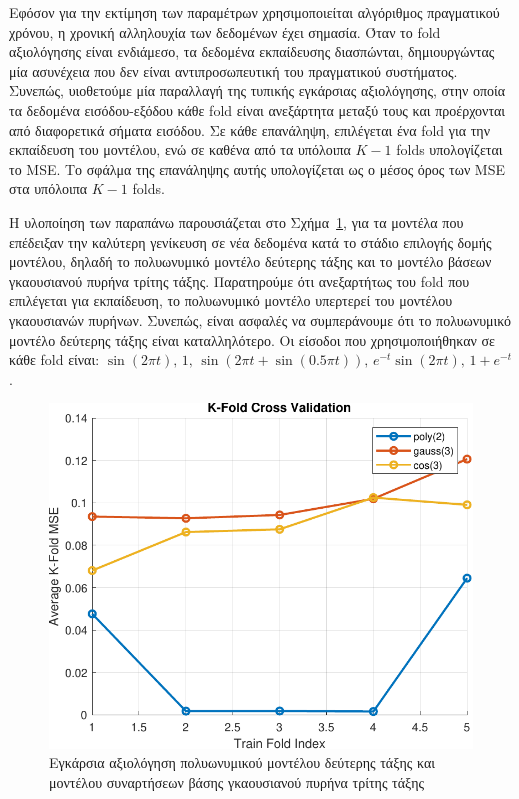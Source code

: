 \documentclass[a4paper,12pt]{article}
\begin{document}
Εφόσον για την εκτίμηση των παραμέτρων χρησιμοποιείται αλγόριθμος πραγματικού χρόνου, η χρονική αλληλουχία
των δεδομένων έχει σημασία. Όταν το fold αξιολόγησης είναι
ενδιάμεσο, τα δεδομένα εκπαίδευσης διασπώνται, δημιουργώντας μία ασυνέχεια που δεν είναι αντιπροσωπευτική
του πραγματικού συστήματος. Συνεπώς, υιοθετούμε μία παραλλαγή της τυπικής εγκάρσιας αξιολόγησης, στην οποία 
τα δεδομένα εισόδου-εξόδου κάθε fold είναι ανεξάρτητα μεταξύ τους 
και προέρχονται από διαφορετικά σήματα εισόδου. Σε κάθε επανάληψη, επιλέγεται ένα 
fold για την εκπαίδευση του μοντέλου, ενώ σε καθένα από τα 
υπόλοιπα $K-1$ folds υπολογίζεται το 
MSE. Το σφάλμα της επανάληψης αυτής υπολογίζεται ως ο μέσος όρος
των MSE στα υπόλοιπα $K-1$ 
folds. 

Η υλοποίηση των παραπάνω παρουσιάζεται στο Σχήμα~\ref{fig:task2_cross_validation}, για τα μοντέλα που 
επέδειξαν την καλύτερη γενίκευση σε νέα δεδομένα κατά το στάδιο επιλογής δομής μοντέλου, δηλαδή το 
πολυωνυμικό μοντέλο δεύτερης τάξης και το μοντέλο βάσεων γκαουσιανού πυρήνα τρίτης τάξης. 
Παρατηρούμε ότι ανεξαρτήτως του fold που επιλέγεται για εκπαίδευση,
το πολυωνυμικό μοντέλο υπερτερεί του μοντέλου γκαουσιανών πυρήνων. Συνεπώς, είναι ασφαλές να συμπεράνουμε 
ότι το πολυωνυμικό μοντέλο δεύτερης τάξης είναι καταλληλότερο. Οι είσοδοι που χρησιμοποιήθηκαν σε κάθε 
fold είναι: 
$\sin(2 \pi t), \, 1, \, \sin(2 \pi t + \sin(0.5 \pi t)), \, e^{-t} \sin(2 \pi t), \, 1 + e^{-t}$.

\begin{figure}
    \centering
    \includegraphics[width=0.5\linewidth]{plot/task2_cross_validation.pdf}
    \caption{Εγκάρσια αξιολόγηση πολυωνυμικού μοντέλου δεύτερης τάξης και μοντέλου συναρτήσεων 
    βάσης γκαουσιανού πυρήνα τρίτης τάξης}
    \label{fig:task2_cross_validation}
\end{figure}
\end{document}
